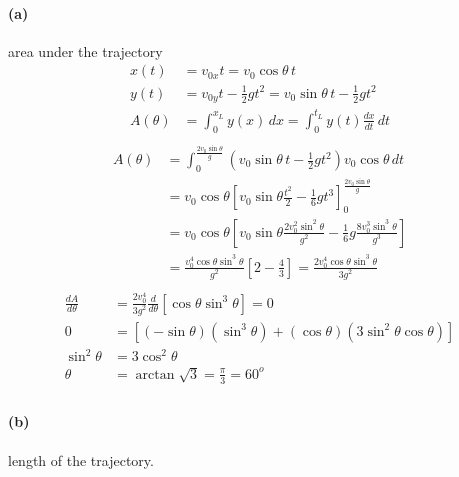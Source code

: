 \documentclass[]{article}
\begin{document}
{		\paragraph{(a)} area under the trajectory
				\begin{equation*}
					\begin{split}
						x(t) &= v_{0x}t = v_0 \cos \theta \, t \\
						y(t) &= v_{0y}t - \frac{1}{2}gt^2 = v_0 \sin \theta \, t - \frac{1}{2}gt^2 \\
						A(\theta) &= \int_{0}^{x_L} y(x) \, dx = \int_{0}^{t_L} y(t) \frac{dx}{dt} \, dt \\
					\end{split}
				\end{equation*}
				\begin{equation*}
					\begin{split}
						A(\theta) &= \int_{0}^{\frac{2v_0 \sin \theta}{g}} \left( v_0 \sin \theta \, t - \frac{1}{2}gt^2 \right)  v_0 \cos \theta \, dt \\
						&= v_0 \cos \theta \left[ v_0 \sin \theta \frac{t^2}{2} - \frac{1}{6}gt^3 \right]_0^{\frac{2v_0 \sin \theta}{g}} \\
						&= v_0 \cos \theta \left[ v_0 \sin \theta \frac{2v^2_0 \sin^2 \theta}{g^2} - \frac{1}{6}g\frac{8v^3_0 \sin^3 \theta}{g^3} \right] \\
						&= \frac{v^4_0 \cos \theta \sin^3 \theta}{g^2} \left[ 2 - \frac{4}{3} \right] = \frac{2v^4_0 \cos \theta \sin^3 \theta}{3g^2} \\
					\end{split}
				\end{equation*}
				\begin{equation*}
					\begin{split}
						\frac{dA}{d\theta} &= \frac{2v^4_0}{3g^2} \frac{d}{d\theta} \left[ \cos \theta \sin^3 \theta \right] = 0 \\
						0 &= \left[ (-\sin \theta)(\sin^3 \theta) + (\cos \theta)(3\sin^2 \theta \cos \theta) \right] \\
						\sin^2 \theta &= 3\cos^2 \theta \\
						\theta &= \arctan \sqrt{3} = \frac{\pi}{3} = 60^o \\
					\end{split}
				\end{equation*}
				
		\paragraph{(b)} length of the trajectory.
}
\end{document}
